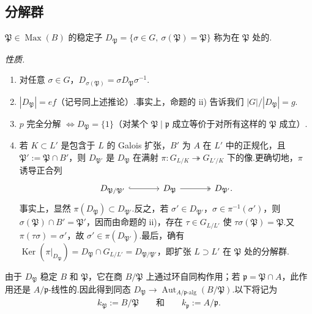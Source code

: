 \subsection{分解群}\label{sec:nt-3-5-3}
\begin{definition*}
$\mathfrak P\in\operatorname{Max}(B)$ 的稳定子 $D_{\mathfrak P}=\{\sigma\in G,\ \sigma(\mathfrak P)=\mathfrak P\}$ 称为在 $\mathfrak P$ 处的.
\end{definition*}
\emph{性质.}
\begin{enumerate}[label=\roman*)]
\item 对任意 $\sigma\in G$，$D_{\sigma(\mathfrak P)}=\sigma D_{\mathfrak P}\sigma^{-1}$.
\item $|D_{\mathfrak P}|=ef$（记号同上述推论）.事实上，命题的 ii) 告诉我们 $|G|/|D_{\mathfrak P}|=g$.
\item $p$ 完全分解 $\Leftrightarrow D_{\mathfrak P}=\{1\}$（对某个 $\mathfrak P\mid\mathfrak p$ 成立等价于对所有这样的 $\mathfrak P$ 成立）.
\item 若 $K\subset L'$ 是包含于 $L$ 的 Galois 扩张，$B'$ 为 $A$ 在 $L'$ 中的正规化，且 $\mathfrak P':=\mathfrak P\cap B'$，则 $D_{\mathfrak P'}$ 是 $D_{\mathfrak P}$ 在满射 $\pi:G_{L/K}\twoheadrightarrow G_{L'/K}$ 下的像.更确切地，$\pi$ 诱导正合列
\begin{align*}
\begin{tikzcd}[ampersand replacement=\&,column sep=large]
D_{\mathfrak P/\mathfrak P'}\arrow[r,hook]\&D_{\mathfrak P}\arrow[r,two heads]\&D_{\mathfrak P'}.
\end{tikzcd}
\end{align*}
事实上，显然 $\pi(D_{\mathfrak P})\subset D_{\mathfrak P'}$.反之，若 $\sigma'\in D_{\mathfrak P'}$，$\sigma\in\pi^{-1}(\sigma')$，则 $\sigma(\mathfrak P)\cap B'=\mathfrak P'$，因而由命题的 ii)，存在 $\tau\in G_{L/L'}$ 使 $\tau\sigma(\mathfrak P)=\mathfrak P$.又 $\pi(\tau\sigma)=\sigma'$，故 $\sigma'\in\pi(D_{\mathfrak P'})$.最后，确有 $\operatorname{Ker}(\pi|_{D_{\mathfrak P}})=D_{\mathfrak P}\cap G_{L/L'}=D_{\mathfrak P/\mathfrak P'}$，即扩张 $L\supset L'$ 在 $\mathfrak P$ 处的分解群.
\end{enumerate}
由于 $D_{\mathfrak P}$ 稳定 $B$ 和 $\mathfrak P$，它在商 $B/\mathfrak P$ 上通过环自同构作用；若 $\mathfrak p=\mathfrak P\cap A$，此作用还是 $A/\mathfrak p$-线性的.因此得到同态 $D_{\mathfrak P}\longrightarrow\operatorname{Aut}_{A/\mathfrak p\text{-alg}}(B/\mathfrak P)$.以下将记为
\begin{align*}
k_{\mathfrak P}:=B/\mathfrak P\qquad\text{和}\qquad k_{\mathfrak p}:=A/\mathfrak p.
\end{align*}

